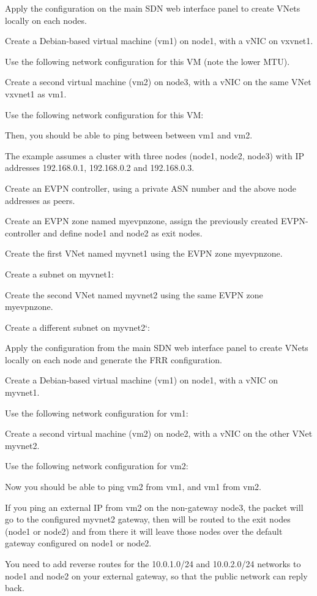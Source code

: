 Apply the configuration on the main SDN web interface panel to create VNets locally on each nodes.

Create a Debian-based virtual machine (vm1) on node1, with a vNIC on vxvnet1.

Use the following network configuration for this VM (note the lower MTU).

Create a second virtual machine (vm2) on node3, with a vNIC on the same VNet vxvnet1 as vm1.

Use the following network configuration for this VM:

Then, you should be able to ping between between vm1 and vm2.

The example assumes a cluster with three nodes (node1, node2, node3) with IP addresses 192.168.0.1, 192.168.0.2 and 192.168.0.3.

Create an EVPN controller, using a private ASN number and the above node addresses as peers.

Create an EVPN zone named myevpnzone, assign the previously created EVPN-controller and define node1 and node2 as exit nodes.

Create the first VNet named myvnet1 using the EVPN zone myevpnzone.

Create a subnet on myvnet1:

Create the second VNet named myvnet2 using the same EVPN zone myevpnzone.

Create a different subnet on myvnet2`:

Apply the configuration from the main SDN web interface panel to create VNets locally on each node and generate the FRR configuration.

Create a Debian-based virtual machine (vm1) on node1, with a vNIC on myvnet1.

Use the following network configuration for vm1:

Create a second virtual machine (vm2) on node2, with a vNIC on the other VNet myvnet2.

Use the following network configuration for vm2:

Now you should be able to ping vm2 from vm1, and vm1 from vm2.

If you ping an external IP from vm2 on the non-gateway node3, the packet will go to the configured myvnet2 gateway, then will be routed to the exit nodes (node1 or node2) and from there it will leave those nodes over the default gateway configured on node1 or node2.

You need to add reverse routes for the 10.0.1.0/24 and 10.0.2.0/24 networks to node1 and node2 on your external gateway, so that the public network can reply back.

